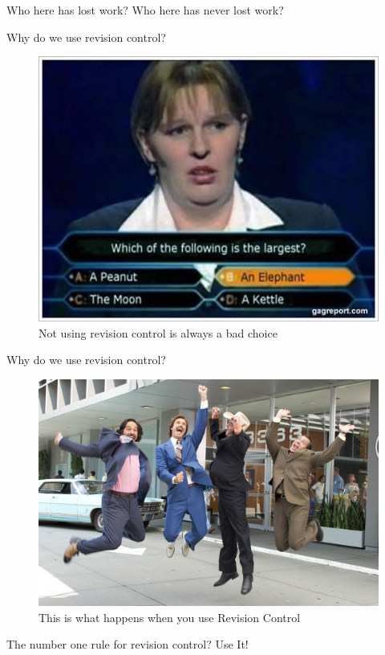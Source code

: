 \begin{frame}{Who here has lost work?}
\huge \centering
Who here has never lost work?
\end{frame}

\begin{frame}{Why do we use revision control?}
    \begin{figure}[ht]
        \centering
        \includegraphics[width=0.8\linewidth]{img/losing.jpg}
        \caption{Not using revision control is always a bad choice}
        \label{fig:figure2}
    \end{figure}
\end{frame}

\begin{frame}{Why do we use revision control?}
    \begin{figure}[ht]
        \centering
        \includegraphics[width=0.8\linewidth]{img/winning.jpg}
        \caption{This is what happens when you use Revision Control}
        \label{fig:figure1}
    \end{figure}
\end{frame}

\begin{frame}{The number one rule for revision control?}
\centering
\huge
Use It! 
\end{frame}
